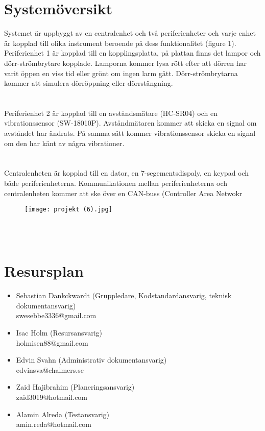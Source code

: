 \documentclass[a4paper]{article}
\begin{document}
\section{Systemöversikt}
Systemet är uppbyggt av en centralenhet och två periferienheter och varje enhet är kopplad till olika instrument beroende på dess funktionalitet (figure 1). Periferienhet 1 är kopplad till en kopplingsplatta, på plattan finns det lampor och dörr-strömbrytare kopplade. Lamporna kommer lysa rött efter att dörren har varit öppen en viss tid eller grönt om ingen larm gått. Dörr-strömbrytarna kommer att simulera dörröppning eller dörrstängning. \\
\\\\
Periferienhet 2 är kopplad till en avståndsmätare (HC-SR04) och en vibrationssensor (SW-18010P). Avståndmätaren kommer att skicka en signal om avståndet har ändrats. På samma sätt kommer vibrationssensor skicka en signal om den har känt av några vibrationer. \\
\\\\
Centralenheten är kopplad till en dator, en 7-segementsdispaly, en keypad och både periferienheterna. Kommunikationen mellan periferienheterna och centralenheten kommer att ske över en CAN-buss (Controller Area Netwokr

\begin{figure}[b]
\texttt{[image: projekt (6).jpg]}
\label{fig:drawing}
\end{figure}

\\\\
\section{Resursplan}
\begin{itemize}
 \item Sebastian Dankckwardt (Gruppledare, Kodstandardansvarig, teknisk dokumentansvarig)
 \\swesebbe3336@gmail.com
 \item Isac Holm (Resursansvarig)
 \\holmisen88@gmail.com
 \item Edvin Svahn (Administrativ dokumentansvarig)
 \\edvinsva@chalmers.se
 \item Zaid Hajibrahim (Planeringsansvarig)
 \\zaid3019@hotmail.com
 \item Alamin Alreda (Testansvarig)
 \\amin.reda@hotmail.com
\end{itemize}
\end{document}
